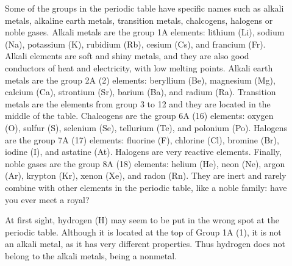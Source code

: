 \documentclass[main.tex]{subfiles}
\begin{document}
\begin{description}
\item[] Some of the groups in the periodic table have specific names such as alkali metals, alkaline earth metals, transition metals, chalcogens, halogens or noble gases. Alkali metals are the group 1A elements: lithium (Li), sodium (Na), potassium (K), rubidium (Rb), cesium (Cs), and francium (Fr). Alkali elements are soft and shiny metals, and they are also good conductors of heat and electricity, with low melting points. Alkali earth metals are the group 2A (2) elements: beryllium (Be), magnesium (Mg), calcium (Ca), strontium (Sr), barium (Ba), and radium (Ra). Transition metals are the elements from group 3 to 12 and they are located in the middle of the table. Chalcogens are the group 6A (16) elements: oxygen (O), sulfur (S), selenium (Se), tellurium (Te), and polonium (Po). Halogens are the group 7A (17) elements: fluorine (F), chlorine (Cl), bromine (Br), iodine (I), and astatine (At). Halogens are very reactive elements. Finally, noble gases are the group 8A (18) elements: helium (He), neon (Ne), argon (Ar), krypton (Kr), xenon (Xe), and radon (Rn). They are  inert and rarely combine with other elements in the periodic table, like a noble family: have you ever meet a royal?

\item[] At first sight, hydrogen (H) may seem to be put in the wrong spot at the periodic table. Although it is located at the top of Group 1A (1), it is not an alkali metal, as it has very different properties. Thus hydrogen does not belong to the alkali metals, being a nonmetal. 


 \end{description}
\end{document}
